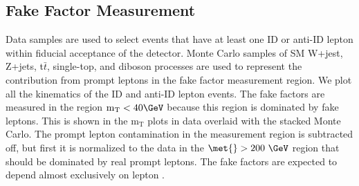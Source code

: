   \FloatBarrier
  
 \subsection{Fake Factor Measurement}
Data samples are used to select events that have at least one ID or anti-ID lepton within fiducial acceptance of the detector.  Monte Carlo samples of SM W+jest, Z+jets, t$\bar t$, single-top, and diboson processes are used to represent the contribution from prompt leptons in the fake factor measurement region.  We plot all the kinematics of the ID and anti-ID lepton events.  The fake factors are measured in the region $\mathrm{m_T} < 40\GeV$ because this region is dominated by fake leptons.  This is shown in the $\mathrm{m_T}$ plots in data overlaid with the stacked Monte Carlo.  The prompt lepton contamination in the measurement region is subtracted off, but first it is normalized to the data in the $\met{} > 200~\GeV$ region that should be dominated by real prompt leptons.  The fake factors are expected to depend almost exclusively on lepton \pt. 
